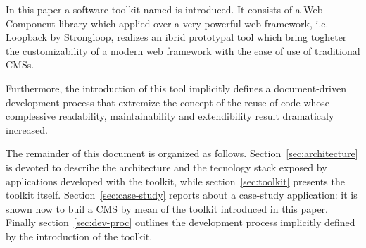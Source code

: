 In this paper a software toolkit named  is introduced. It consists of a Web Component library which applied over a very powerful web framework, i.e. Loopback by Strongloop, realizes an ibrid prototypal tool which bring togheter the customizability of a modern web framework with the ease of use of traditional CMSs.

Furthermore, the introduction of this tool implicitly defines a document-driven development process that extremize the concept of the reuse of code whose complessive readability, maintainability and extendibility result dramaticaly increased.


The remainder of this document is organized as follows. Section~\ref{sec:architecture} is devoted to describe the architecture and the tecnology stack exposed by applications developed with the toolkit, while section~\ref{sec:toolkit} presents the toolkit itself. Section~\ref{sec:case-study} reports about a case-study application: it is shown how to buil a CMS by mean of the toolkit introduced in this paper. Finally section~\ref{sec:dev-proc} outlines the development process implicitly defined by the introduction of the  toolkit.

